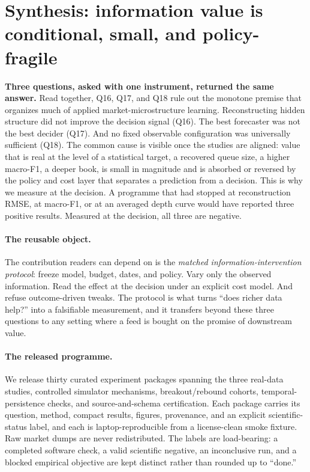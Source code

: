 \section{Synthesis: information value is conditional, small, and policy-fragile}
\label{sec:synthesis}

\textbf{Three questions, asked with one instrument, returned the same answer.} Read
together, Q16, Q17, and Q18 rule out the monotone premise that organizes much of applied
market-microstructure learning. Reconstructing hidden structure did not improve the
decision signal (Q16). The best forecaster was not the best decider (Q17). And no fixed
observable configuration was universally sufficient (Q18). The common cause is visible
once the studies are aligned: value that is real at the level of a statistical target, a recovered queue size, a higher macro-F1, a deeper book, is small in magnitude and is
absorbed or reversed by the policy and cost layer that separates a prediction from a
decision. This is why we measure at the decision. A programme that had stopped at
reconstruction RMSE, at macro-F1, or at an averaged depth curve would have reported three
positive results. Measured at the decision, all three are negative.

\paragraph{The reusable object.} The contribution readers can depend on is the
\emph{matched information-intervention protocol}: freeze model, budget, dates, and policy. Vary only the observed information. Read the effect at the decision under an explicit cost
model. And refuse outcome-driven tweaks. The protocol is what turns ``does richer data
help?'' into a falsifiable measurement, and it transfers beyond these three questions to
any setting where a feed is bought on the promise of downstream value.

\paragraph{The released programme.} We release thirty curated experiment packages spanning
the three real-data studies, controlled simulator mechanisms, breakout/rebound cohorts,
temporal-persistence checks, and source-and-schema certification. Each package carries its
question, method, compact results, figures, provenance, and an explicit scientific-status
label, and each is laptop-reproducible from a license-clean smoke fixture. Raw market
dumps are never redistributed. The labels are load-bearing: a completed software check, a
valid scientific negative, an inconclusive run, and a blocked empirical objective are kept
distinct rather than rounded up to ``done.''

